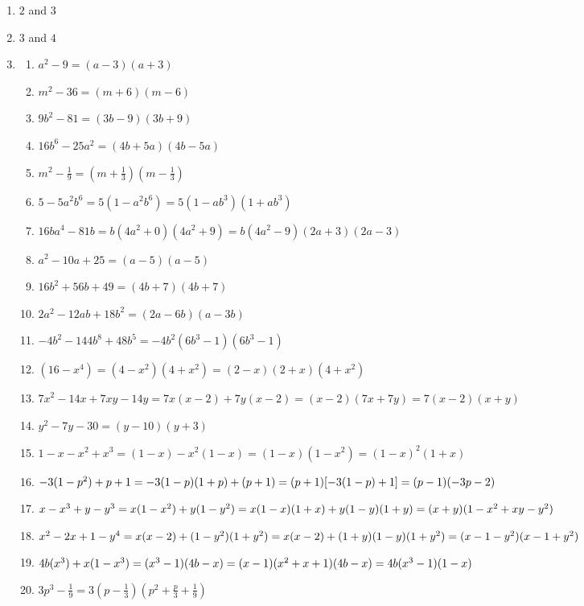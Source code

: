 \begin{solutions}{}
{\begin{enumerate}[itemsep=5pt, label=\textbf{\arabic*}. ]
\item $2$ and $3$%
\item $3$ and $4$%

\item %

\begin{enumerate}[itemsep=5pt, label=\textbf{(\alph*)} ] 
\item ${a}^{2}-9=(a - 3)(a + 3)$%
\item ${m}^{2}-36=(m + 6)(m - 6)$%
\item $9{b}^{2}-81=(3b - 9)(3b + 9)$%
\item $16{b}^{6}-25{a}^{2}=(4b + 5a)(4b - 5a)$%
\item ${m}^{2}-\frac{1}{9}=(m +\frac{1}{3})(m -\frac{1}{3})$%
\item $5-5{a}^{2}{b}^{6}=5(1-a^2b^6)=5(1 - ab^3)(1 + ab^3)$%
\item $16b{a}^{4}-81b=b(4a^2+0)(4a^2+9)=b(4a^2 - 9)(2a + 3)(2a - 3)$%
\item ${a}^{2}-10a+25=(a - 5)(a - 5)$%
\item $16{b}^{2}+56b+49=(4b + 7)(4b + 7)$%
\item $2{a}^{2}-12ab+18{b}^{2}=(2a - 6b)(a - 3b)$%
\item $-4{b}^{2}-144{b}^{8}+48{b}^{5}=-4b^2(6b^3 - 1)(6b^3 - 1)$%
\item $(16-{x}^{4})=(4-x^2)(4+x^2)=(2 - x)(2 + x)(4 + x^2)$%
\item ${7x}^{2}-14x+7xy-14y=7x(x-2)+7y(x-2)=(x-2)(7x+7y)=7(x - 2)(x + y)$%
\item ${y}^{2}-7y-30=(y - 10)(y + 3)$%
\item $1-x-{x}^{2}+{x}^{3}=(1-x)-x^2(1-x)=(1-x)(1-x^2)=(1 - x)^{2}(1 +x)$%
\item $-3(1-{p}^{2})+p+1\\ =-3(1-p)(1+p)+(p+1)\\=(p+1)[-3(1-p)+1]\\=(p - 1)(-3p-2)$%
\item $x-x^3+y-y^3\\=x(1-x^2)+y(1-y^2)\\=x(1-x)(1+x)+y(1-y)(1+y)\\=(x+y)(1-x^2+xy-y^2)$
\item $x^2-2x+1-y^4\\=x(x-2)+(1-y^2)(1+y^2)\\=x(x-2)+(1+y)(1-y)(1+y^2)\\=(x-1-y^2)(x-1+y^2)$
\item $4b(x^3)+x(1-x^3)\\=(x^3-1)(4b-x)\\=(x-1)(x^2+x+1)(4b-x)\\=4b(x^3-1)(1-x)$
\item $3p^3-\frac{1}{9}=3(p-\frac{1}{3})(p^2+\frac{p}{3}+\frac{1}{9})$
\end{enumerate}



\end{enumerate}}
\end{solutions}
